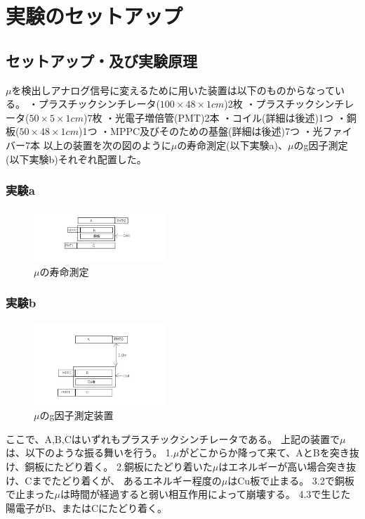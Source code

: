 \section{実験のセットアップ}
\subsection{セットアップ・及び実験原理}
$\mu$を検出しアナログ信号に変えるために用いた装置は以下のものからなっている。
・プラスチックシンチレータ($100\times 48\times 1cm$)2枚
・プラスチックシンチレータ($50\times 5\times 1cm$)7枚
・光電子増倍管(PMT)2本
・コイル(詳細は後述)1つ
・銅板($50\times 48\times 1cm$)1つ
・MPPC及びそのための基盤(詳細は後述)7つ
・光ファイバー7本
以上の装置を次の図のように$\mu$の寿命測定(以下実験a)、$\mu$のg因子測定(以下実験b)それぞれ配置した。
\subsubsection{実験a}
\begin{figure}[h]
  \includegraphics[width=5cm,bb=0 0 640 250]{zikken_a.jpg}
  \caption{$\mu$の寿命測定}
\end{figure}
\subsubsection{実験b}
\begin{figure}[h]
  \includegraphics[width=5cm,bb=0 0 640 400]{zikken_b.jpg}
  \caption{$\mu$のg因子測定装置}
\end{figure}
ここで、A,B,Cはいずれもプラスチックシンチレータである。
上記の装置で$\mu$は、以下のような振る舞いを行う。
1.$\mu$がどこからか降って来て、AとBを突き抜け、銅板にたどり着く。
2.銅板にたどり着いた$\mu$はエネルギーが高い場合突き抜け、Cまでたどり着くが、
あるエネルギー程度の$\mu$はCu板で止まる。
3.2で銅板で止まった$\mu$は時間が経過すると弱い相互作用によって崩壊する。
4.3で生じた陽電子がB、またはCにたどり着く。

